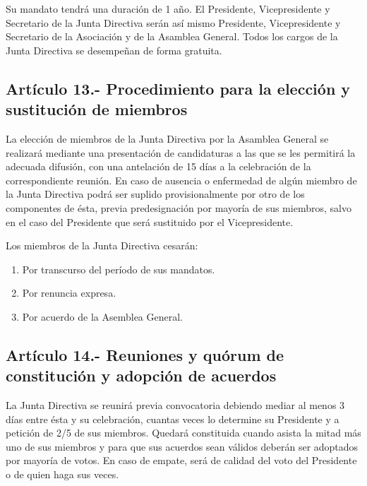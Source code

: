 \documentclass[12pt]{article}
\begin{document}
Su mandato tendrá una duración de 1 año. El Presidente, Vicepresidente y Secretario de la Junta Directiva serán así mismo Presidente, Vicepresidente y Secretario de la Asociación y de la Asamblea General. Todos los cargos de la Junta Directiva se desempeñan de forma gratuita.

\subsection{Artículo 13.- Procedimiento para la elección y sustitución de miembros}
La elección de miembros de la Junta Directiva por la Asamblea General se realizará mediante una presentación de candidaturas a las que se les permitirá la adecuada difusión, con una antelación de 15 días a la celebración de la correspondiente reunión. En caso de ausencia o enfermedad de algún miembro de la Junta Directiva podrá ser suplido provisionalmente por otro de los componentes de ésta, previa predesignación por mayoría de sus miembros, salvo en el caso del Presidente que será sustituido por el Vicepresidente.

Los miembros de la Junta Directiva cesarán:
\begin{enumerate}[label=\alph*)]
    \item Por transcurso del período de sus mandatos.
    \item Por renuncia expresa.
    \item Por acuerdo de la Asemblea General.
\end{enumerate}

\subsection{Artículo 14.- Reuniones y quórum de constitución y adopción de acuerdos}
La Junta Directiva se reunirá previa convocatoria debiendo mediar al menos 3 días entre ésta y su celebración, cuantas veces lo determine su Presidente y a petición de 2/5 de sus miembros. Quedará constituida cuando asista la mitad más uno de sus miembros y para que sus acuerdos sean válidos deberán ser adoptados por mayoría de votos. En caso de empate, será de calidad del voto del Presidente o de quien haga sus veces.
\end{document}

